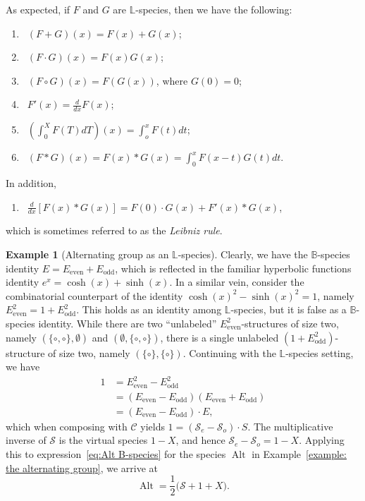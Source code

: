 \documentclass[a4paper, 11pt]{article}
\newcommand{\LL}{\mathbb{L}}
\newcommand{\BB}{\mathbb{B}}
\DeclareMathOperator{\Alt}{Alt}
\newcommand{\Cyc}{\mathcal{C}}
\newcommand{\Sym}{\mathcal{S}}
\newcommand{\Even}[1]{#1_{\mathrm{even}}}
\newcommand{\Odd}[1]{#1_{\mathrm{odd}}}
\theoremstyle{definition}
\newtheorem{example}[theorem]{Example}
\begin{document}
As expected, if $F$ and $G$ are $\LL$-species, then we have the following:
\begin{enumerate}[label=(\alph*)]
\item \, $(F+G)(x) = F(x) + G(x)$;
\item \, $(F\cdot G)(x) = F(x)G(x)$;
\item \, $(F \circ G)(x) = F(G(x))$, where $G(0)=0$;
\item \, $\displaystyle F'(x) = \frac{d}{dx} F(x)$;
\item\label{prop:speciesintegral}
 \, $\displaystyle \left( \int_0^X F(T) dT \right)(x) = \int_o^x F(t) dt$;
\item \, $\displaystyle (F * G)(x) = F(x) * G(x)=\int_0^x F(x-t)G(t)dt$.
\end{enumerate}
In addition,
\begin{enumerate}[resume, label=(\alph*)]
\item \, $\displaystyle \frac{d}{dx} [F(x)*G(x)] = F(0) \cdot G(x) + F'(x) * G(x)$,
\end{enumerate}
which is sometimes referred to as the \emph{Leibniz rule}.

\begin{example}[Alternating group as an $\LL$-species]\label{ex:Alt L-species}
  Clearly, we have the $\BB$-species identity $E=\Even{E}+\Odd{E}$,
  which is reflected in the familiar hyperbolic functions identity
  $e^x=\cosh(x)+\sinh(x)$. In a similar vein, consider the combinatorial
  counterpart of the identity $\cosh(x)^2-\sinh(x)^2=1$, namely
  $\Even{E}^2=1+\Odd{E}^2$. This holds as an identity among $\LL$-species,
  but it is false as a $\BB$-species identity. While there are two
  ``unlabeled'' $\Even{E}^2$-structures of size two, namely $(\{\circ,\circ\},\emptyset)$
  and $(\emptyset,\{\circ,\circ\})$, there is a single unlabeled
  $(1+\Odd{E}^2)$-structure of size two, namely $(\{\circ\},\{\circ\})$.
  Continuing with the $\LL$-species setting, we have
  \begin{align*}
    1 &= \Even{E}^2-\Odd{E}^2 \\
      &= (\Even{E}-\Odd{E})(\Even{E}+\Odd{E}) \\
      &= (\Even{E}-\Odd{E})\cdot E,
  \end{align*}
  which when composing with $\Cyc$ yields $1 = (\Sym_e-\Sym_o)\cdot S$.
  The multiplicative inverse of $\Sym$ is the virtual species $1-X$, and hence
  $\Sym_e-\Sym_o = 1-X$. Applying this to expression~\eqref{eq:Alt B-species}
  for the species $\Alt$ in Example~\ref{example: the alternating group},
  we arrive at
  \begin{equation}\label{eq:Alt L-species}
    \Alt = \frac{1}{2}\bigl(\Sym + 1+ X\bigr).
  \end{equation}
\end{example}
\end{document}
